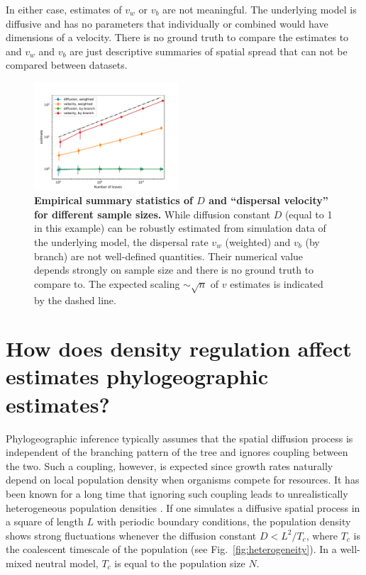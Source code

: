 \documentclass[aps,rmp, twocolumn]{revtex4}
\begin{document}
In either case, estimates of $v_w$ or $v_b$ are not meaningful.
The underlying model is diffusive and has no parameters that individually or combined would have dimensions of a velocity.
There is no ground truth to compare the estimates to and $v_w$ and $v_b$ are just descriptive summaries of spatial spread that can not be compared between datasets.


\begin{figure}[tb]
    \includegraphics*[width=0.48\textwidth]{figures/kingman_dispersal.pdf}
    \caption{\label{fig:D_and_v}{\bf Empirical summary statistics of $D$ and ``dispersal velocity'' for different sample sizes.}
    While diffusion constant $D$ (equal to 1 in this example) can be robustly estimated from simulation data of the underlying model, the dispersal rate $v_w$ (weighted) and $v_b$ (by branch) are not well-defined quantities. Their numerical value depends strongly on sample size and there is no ground truth to compare to. The expected scaling $\sim \sqrt{n}$ of $v$ estimates is indicated by the dashed line.}
\end{figure}

\section*{How does density regulation affect estimates phylogeographic estimates?}
Phylogeographic inference typically assumes that the spatial diffusion process is independent of the branching pattern of the tree and ignores coupling between the two.
Such a coupling, however, is expected since growth rates naturally depend on local population density when organisms compete for resources.
It has been known for a long time that ignoring such coupling leads to unrealistically heterogeneous population densities \citep{felsenstein_pain_1975}.
If one simulates a diffusive spatial process in a square of length $L$ with periodic boundary conditions, the population density shows strong fluctuations whenever the diffusion constant $D<L^2/T_c$, where $T_c$ is the coalescent timescale of the population (see Fig.~\ref{fig:heterogeneity}).
In a well-mixed neutral model, $T_c$ is equal to the population size $N$.
\end{document}
